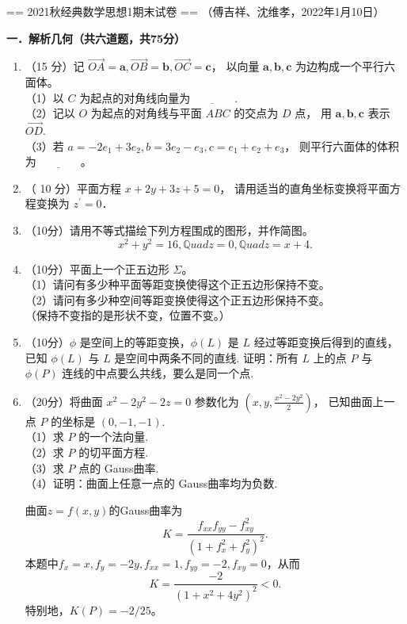 == 2021秋经典数学思想1期末试卷 ==
（傅吉祥、沈维孝，2022年1月10日）

\textbf{一．解析几何（共六道题，共75分）}
\begin{enumerate}
\item（15 分）记 $\overrightarrow{OA}=\boldsymbol{a}, \overrightarrow{OB}=\boldsymbol{b}, \overrightarrow{OC}=\boldsymbol{c}$，
以向量 $\boldsymbol{a}, \boldsymbol{b}, \boldsymbol{c}$ 为边构成一个平行六面体。\\
（1）以 $C$ 为起点的对角线向量为$\underline{\qquad\qquad}$.\\
（2）记以 $O$ 为起点的对角线与平面 $ABC$ 的交点为 $D$ 点，
用 $\boldsymbol{a}, \boldsymbol{b}, \boldsymbol{c}$ 表示 $\overrightarrow{O D}$.\\
（3）若 $a=-2 e_{1}+3 e_{2}, b=3 e_{2}-e_{3}, c=e_{1}+e_{2}+e_{3}$，
则平行六面体的体积为$\underline{\qquad\qquad}$。
\item（ 10 分）平面方程 $x+2 y+3 z+5=0$，
请用适当的直角坐标变换将平面方程变换为 $z^{\prime}=0$．
\item（10分）请用不等式描绘下列方程围成的图形，并作简图。
$$x^{2}+y^{2}=16, \mathbb{Q}uad z=0, \mathbb{Q}uad z=x+4.$$
\item（10分）平面上一个正五边形 $\Sigma$。\\
（1）请问有多少种平面等距变换使得这个正五边形保持不变。\\
（2）请问有多少种空间等距变换使得这个正五边形保持不变。\\
（保持不变指的是形状不变，位置不变。）
\item（10分）$\phi$ 是空间上的等距变换，$\phi(L)$ 是 $L$ 经过等距变换后得到的直线，
已知 $\phi(L)$ 与 $L$ 是空间中两条不同的直线. 
证明：所有 $L$ 上的点 $P$ 与 $\phi(P)$ 连线的中点要么共线，要么是同一个点.

\item（20分）将曲面 $x^{2}-2 y^{2}-2 z=0$ 参数化为 $\left(x, y, \frac{x^{2}-2 y^{2}}{2}\right)$，
已知曲面上一点 $P$ 的坐标是 $(0,-1,-1)$.\\
（1）求 $P$ 的一个法向量.\\
（2）求 $P$ 的切平面方程.\\
（3）求 $P$ 点的 Gauss曲率.\\
（4）证明：曲面上任意一点的 Gauss曲率均为负数.
\begin{proofc}[(3),(4)的解答]
    曲面$z=f(x,y)$的Gauss曲率为
    \[K=\frac{f_{xx}f_{yy}-f_{xy}^2}{(1+f_x^2+f_y^2)^2}.\]
    本题中$f_x=x,f_y=-2y,f_{xx}=1,f_{yy}=-2,f_{xy}=0$，从而
    \[K=\frac{-2}{(1+x^2+4y^2)^2}<0.\]
    特别地，$K(P)=-2/25$。
\end{proofc}
\end{enumerate}

